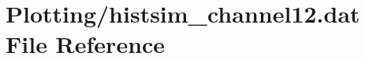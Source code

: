 \hypertarget{Plotting_2histsim__channel12_8dat}{}\section{Plotting/histsim\+\_\+channel12.dat File Reference}
\label{Plotting_2histsim__channel12_8dat}
